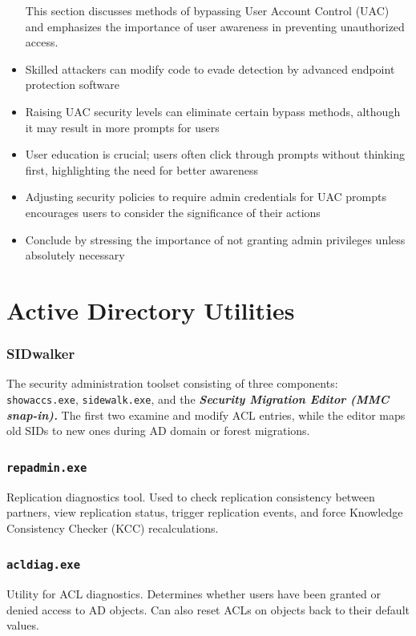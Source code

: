 \begin{itemize}
This section discusses methods of bypassing User Account Control (UAC) and emphasizes the importance of user awareness in preventing unauthorized access.
\item Skilled attackers can modify code to evade detection by advanced endpoint protection software
\item Raising UAC security levels can eliminate certain bypass methods, although it may result in more prompts for users
\item User education is crucial; users often click through prompts without thinking first, highlighting the need for better awareness
\item Adjusting security policies to require admin credentials for UAC prompts encourages users to consider the significance of their actions
\item Conclude by stressing the importance of not granting admin privileges unless absolutely necessary

\end{itemize}

\section{Active Directory Utilities}
\subsubsection{SIDwalker}
The security administration toolset consisting of three components: \verb|showaccs.exe|, \verb|sidewalk.exe|, and the \textit{\textbf{Security Migration Editor (MMC snap-in).}} The first two examine and modify ACL entries, while the editor maps old SIDs to new ones during AD domain or forest migrations.

\subsubsection{\texttt{repadmin.exe}}
Replication diagnostics tool. Used to check replication consistency between partners, view replication status, trigger replication events, and force Knowledge Consistency Checker (KCC) recalculations.

\subsubsection{\texttt{acldiag.exe}}
Utility for ACL diagnostics. Determines whether users have been granted or denied access to AD objects. Can also reset ACLs on objects back to their default values.

